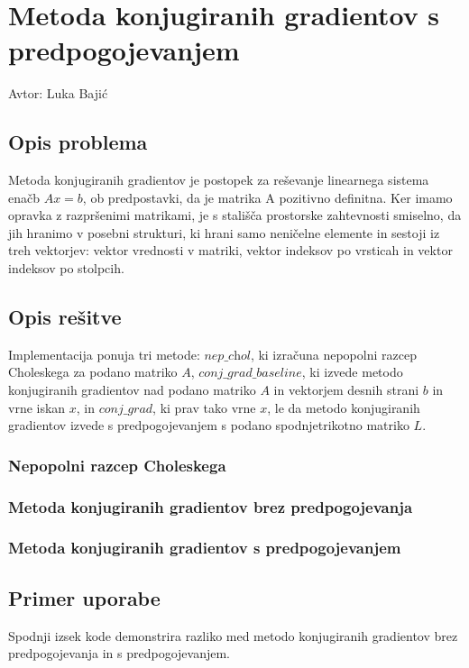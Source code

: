 \documentclass[12pt,a4paper]{article}
\begin{document}
\section{Metoda konjugiranih gradientov s predpogojevanjem}
Avtor: Luka Bajić


\subsection{Opis problema}
Metoda konjugiranih gradientov je postopek za reševanje linearnega sistema enačb $Ax = b$, ob predpostavki, da je matrika A pozitivno definitna. Ker imamo opravka z razpršenimi matrikami, je s stališča prostorske zahtevnosti smiselno, da jih hranimo v posebni strukturi, ki hrani samo neničelne elemente in sestoji iz treh vektorjev: vektor  vrednosti v matriki, vektor indeksov po vrsticah in vektor indeksov po stolpcih. 


\subsection{Opis rešitve}
Implementacija ponuja tri metode: $\textit{nep\_chol}$, ki izračuna nepopolni razcep Choleskega za podano matriko $A$, $\textit{conj\_grad\_baseline}$, ki izvede metodo konjugiranih gradientov nad podano matriko $A$ in vektorjem desnih strani $b$ in vrne iskan $x$, in $\textit{conj\_grad}$,  ki prav tako vrne $x$, le da metodo konjugiranih gradientov izvede s predpogojevanjem s podano  spodnjetrikotno matriko $L$.


\subsubsection{Nepopolni razcep Choleskega}

\subsubsection{Metoda konjugiranih gradientov brez predpogojevanja}

\subsubsection{Metoda konjugiranih gradientov s predpogojevanjem}

\subsection{Primer uporabe}
Spodnji izsek kode demonstrira razliko med metodo konjugiranih gradientov brez predpogojevanja in s predpogojevanjem. 
\end{document}
